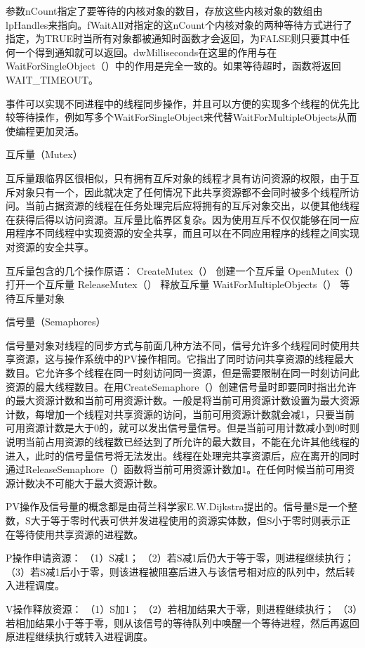 参数nCount指定了要等待的内核对象的数目，存放这些内核对象的数组由lpHandles来指向。fWaitAll对指定的这nCount个内核对象的两种等待方式进行了指定，为TRUE时当所有对象都被通知时函数才会返回，为FALSE则只要其中任何一个得到通知就可以返回。dwMilliseconds在这里的作用与在WaitForSingleObject（）中的作用是完全一致的。如果等待超时，函数将返回WAIT_TIMEOUT。
 

事件可以实现不同进程中的线程同步操作，并且可以方便的实现多个线程的优先比较等待操作，例如写多个WaitForSingleObject来代替WaitForMultipleObjects从而使编程更加灵活。 

互斥量（Mutex） 

互斥量跟临界区很相似，只有拥有互斥对象的线程才具有访问资源的权限，由于互斥对象只有一个，因此就决定了任何情况下此共享资源都不会同时被多个线程所访问。当前占据资源的线程在任务处理完后应将拥有的互斥对象交出，以便其他线程在获得后得以访问资源。互斥量比临界区复杂。因为使用互斥不仅仅能够在同一应用程序不同线程中实现资源的安全共享，而且可以在不同应用程序的线程之间实现对资源的安全共享。
 

互斥量包含的几个操作原语： 
CreateMutex（）    创建一个互斥量 
OpenMutex（）    打开一个互斥量 
ReleaseMutex（）    释放互斥量 
WaitForMultipleObjects（） 等待互斥量对象 

信号量（Semaphores）

信号量对象对线程的同步方式与前面几种方法不同，信号允许多个线程同时使用共享资源，这与操作系统中的PV操作相同。它指出了同时访问共享资源的线程最大数目。它允许多个线程在同一时刻访问同一资源，但是需要限制在同一时刻访问此资源的最大线程数目。在用CreateSemaphore（）创建信号量时即要同时指出允许的最大资源计数和当前可用资源计数。一般是将当前可用资源计数设置为最大资源计数，每增加一个线程对共享资源的访问，当前可用资源计数就会减1，只要当前可用资源计数是大于0的，就可以发出信号量信号。但是当前可用计数减小到0时则说明当前占用资源的线程数已经达到了所允许的最大数目，不能在允许其他线程的进入，此时的信号量信号将无法发出。线程在处理完共享资源后，应在离开的同时通过ReleaseSemaphore（）函数将当前可用资源计数加1。在任何时候当前可用资源计数决不可能大于最大资源计数。

PV操作及信号量的概念都是由荷兰科学家E.W.Dijkstra提出的。信号量S是一个整数，S大于等于零时代表可供并发进程使用的资源实体数，但S小于零时则表示正在等待使用共享资源的进程数。

P操作申请资源： 
（1）S减1； 
（2）若S减1后仍大于等于零，则进程继续执行； 
（3）若S减1后小于零，则该进程被阻塞后进入与该信号相对应的队列中，然后转入进程调度。

V操作释放资源： 
（1）S加1； 
（2）若相加结果大于零，则进程继续执行； 
（3）若相加结果小于等于零，则从该信号的等待队列中唤醒一个等待进程，然后再返回原进程继续执行或转入进程调度。 

